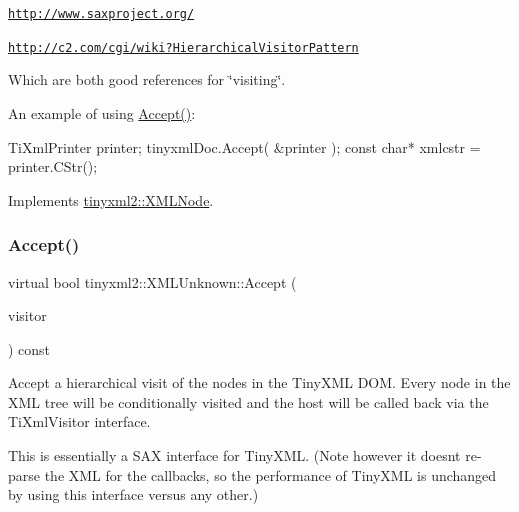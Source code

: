 \begin{DoxyItemize}
\item \href{http://www.saxproject.org/}{\tt http\+://www.\+saxproject.\+org/}
\item \href{http://c2.com/cgi/wiki?HierarchicalVisitorPattern}{\tt http\+://c2.\+com/cgi/wiki?\+Hierarchical\+Visitor\+Pattern}
\end{DoxyItemize}

Which are both good references for \char`\"{}visiting\char`\"{}.

An example of using \hyperlink{classtinyxml2_1_1XMLUnknown_a8a06b8c82117ca969a432e17a46830fc}{Accept()}\+: \begin{DoxyVerb}TiXmlPrinter printer;
tinyxmlDoc.Accept( &printer );
const char* xmlcstr = printer.CStr();
\end{DoxyVerb}
 

Implements \hyperlink{classtinyxml2_1_1XMLNode_a81e66df0a44c67a7af17f3b77a152785}{tinyxml2\+::\+X\+M\+L\+Node}.

\mbox{\label{classtinyxml2_1_1XMLUnknown_a70983aa1b1cff3d3aa6d4d0a80e5ee48}} 
\subsubsection{\texorpdfstring{Accept()}{Accept()}\hspace{0.1cm}{\footnotesize\ttfamily [2/2]}}
{\footnotesize\ttfamily virtual bool tinyxml2\+::\+X\+M\+L\+Unknown\+::\+Accept (\begin{DoxyParamCaption}\item[{\hyperlink{classtinyxml2_1_1XMLVisitor}{X\+M\+L\+Visitor} $\ast$}]{visitor }\end{DoxyParamCaption}) const\hspace{0.3cm}{\ttfamily [virtual]}}

Accept a hierarchical visit of the nodes in the Tiny\+X\+ML D\+OM. Every node in the X\+ML tree will be conditionally visited and the host will be called back via the Ti\+Xml\+Visitor interface.

This is essentially a S\+AX interface for Tiny\+X\+ML. (Note however it doesn\textquotesingle{}t re-\/parse the X\+ML for the callbacks, so the performance of Tiny\+X\+ML is unchanged by using this interface versus any other.)


